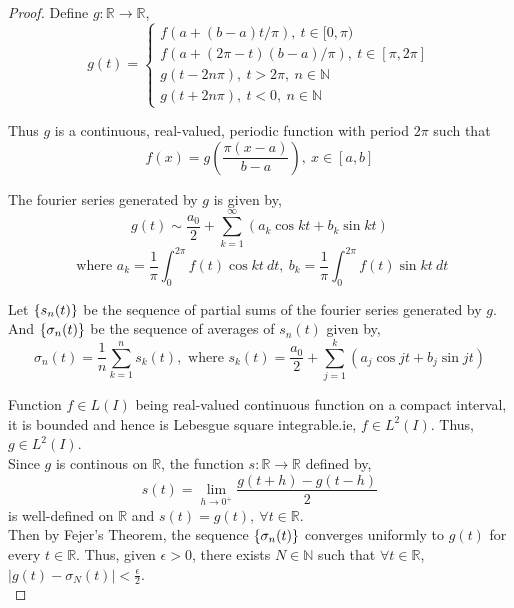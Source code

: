 \begin{proof}
	Define \(g : \mathbb{R} \to \mathbb{R}\),
	\[ g(t) = \begin{cases}
		f(a+(b-a)t/\pi),\ t \in [0,\pi) \\ f(a+(2\pi-t)(b-a)/\pi),\ t \in [\pi,2\pi] \\ g(t - 2n\pi),\ t > 2\pi,\ n \in \mathbb{N} \\ g(t+2n\pi),\ t < 0,\ n \in \mathbb{N} \end{cases}\]

		Thus $g$ is a continuous, real-valued, periodic function with period $2\pi$ such that
		\begin{equation}
			f(x) = g\left(\frac{\pi (x-a)}{b-a}\right),\ x \in [a,b] \label{equ:fx}
		\end{equation}

		The fourier series generated by $g$ is given by,
		\[ g(t) \sim \frac{a_0}{2} + \sum_{k=1}^\infty \left( a_k \cos kt + b_k \sin kt \right)\]
		\[ \text{ where } a_k = \frac{1}{\pi} \int_0^{2\pi} f(t) \cos kt\ dt,\ b_k = \frac{1}{\pi} \int_0^{2\pi} f(t) \sin kt\ dt\]

		Let \(\{s_n(t)\}\) be the sequence of partial sums of the fourier series generated by $g$. And \( \{\sigma_n(t)\}\)  be the sequence of averages of $s_n(t)$ given by,
		\[\sigma_n(t) = \frac{1}{n} \sum_{k = 1}^n s_k(t),\text{ where } s_k(t) = \frac{a_0}{2} + \sum_{j = 1}^k \left( a_j \cos jt + b_j \sin jt \right)\]

		Function \(f \in L(I)\) being real-valued continuous function on a compact interval, it is bounded and hence is Lebesgue square integrable.ie, \(f \in L^2(I)\). Thus, \(g \in L^2(I)\).\\

		Since $g$ is continous on $\mathbb{R}$, the function \(s : \mathbb{R} \to \mathbb{R}\) defined by,
		\[ s(t) = \lim_{h \to 0^+} \frac{g(t+h)-g(t-h)}{2} \]
		is well-defined on $\mathbb{R}$ and \(s(t) = g(t),\ \forall t \in \mathbb{R}\).\\

		Then by Fejer's Theorem, the sequence \(\{\sigma_n(t)\}\) converges uniformly to $g(t)$ for every \(t \in \mathbb{R}\). Thus, given \(\epsilon > 0\), there exists \(N \in \mathbb{N}\) such that \(\forall t \in \mathbb{R}\), \(|g(t)-\sigma_N(t)| < \frac{\epsilon}{2}\).\\


\end{proof}
